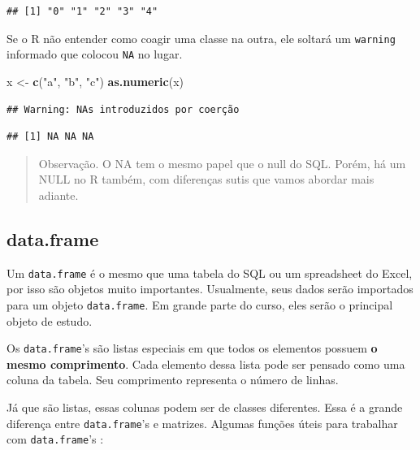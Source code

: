 \documentclass[
]{book}
\newenvironment{Shaded}{\begin{snugshade}}{\end{snugshade}}
\newcommand{\KeywordTok}[1]{\textcolor[rgb]{0.13,0.29,0.53}{\textbf{#1}}}
\newcommand{\NormalTok}[1]{#1}
\newcommand{\StringTok}[1]{\textcolor[rgb]{0.31,0.60,0.02}{#1}}
\begin{document}
\begin{verbatim}
## [1] "0" "1" "2" "3" "4"
\end{verbatim}

Se o R não entender como coagir uma classe na outra, ele soltará um \texttt{warning} informado que colocou \texttt{NA} no lugar.

\begin{Shaded}
\begin{Highlighting}[]
\NormalTok{x <{-}}\StringTok{ }\KeywordTok{c}\NormalTok{(}\StringTok{"a"}\NormalTok{, }\StringTok{"b"}\NormalTok{, }\StringTok{"c"}\NormalTok{)}
\KeywordTok{as.numeric}\NormalTok{(x)}
\end{Highlighting}
\end{Shaded}

\begin{verbatim}
## Warning: NAs introduzidos por coerção
\end{verbatim}

\begin{verbatim}
## [1] NA NA NA
\end{verbatim}

\begin{quote}
Observação. O NA tem o mesmo papel que o null do SQL. Porém, há um NULL no R também, com diferenças sutis que vamos abordar mais adiante.
\end{quote}

\hypertarget{data.frame}{%
\subsection{data.frame}\label{data.frame}}

Um \texttt{data.frame} é o mesmo que uma tabela do SQL ou um spreadsheet do Excel, por isso são objetos muito importantes. Usualmente, seus dados serão importados para um objeto \texttt{data.frame}. Em grande parte do curso, eles serão o principal objeto de estudo.

Os \texttt{data.frame}'s são listas especiais em que todos os elementos possuem \textbf{o mesmo comprimento}. Cada elemento dessa lista pode ser pensado como uma coluna da tabela. Seu comprimento representa o número de linhas.

Já que são listas, essas colunas podem ser de classes diferentes. Essa é a grande diferença entre \texttt{data.frame}'s e matrizes. Algumas funções úteis para trabalhar com \texttt{data.frame}'s :
\end{document}
